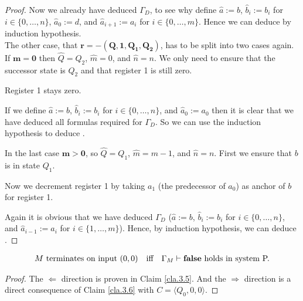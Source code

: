 \begin{proof}
	Now we already have deduced $\Gamma_D$, to see why define $\widehat{a}:=b$, $\widehat{b}_i:=b_i$ for $i\in\{0,\dots,n\}$, $\widehat{a}_0:=d$, and $\widehat{a}_{i+1}:=a_i$ for $i\in\{0,\dots,m\}$.
	Hence we can deduce \false{} by induction hypothesis.\\
	
	The other case, that $\boldsymbol{r=-(Q,1,Q_1,Q_2)}$, has to be split into two cases again. If $\boldsymbol{m=0}$ then $\widehat{Q}=Q_2$, $\widehat{m}=0$, and $\widehat{n}=n$. We only need to ensure that the successor state is $Q_2$ and that register 1 is still zero.
	
	\begin{figure}[H]
		\centering
		
	\end{figure}
	
	Register 1 stays zero.
	
	\begin{figure}[H]
		\centering
		
	\end{figure}
	
	If we define $\widehat{a}:=b$, $\widehat{b}_i:=b_i$ for $i\in\{0,\dots,n\}$, and $\widehat{a}_0:=a_0$ then it is clear that we have deduced all formulas required for $\Gamma_D$. So we can use the induction hypothesis to deduce \false{}.
	
	In the last case $\boldsymbol{m>0}$, so $\widehat{Q}=Q_1$, $\widehat{m}=m-1$, and $\widehat{n}=n$. First we ensure that $b$ is in state $Q_1$.
	
	\begin{figure}[H]
		\centering
		
	\end{figure}
	
	Now we decrement register 1 by taking $a_1$ (the predecessor of $a_0$) as anchor of $b$ for register 1.
	
	\begin{figure}[H]
		\centering
		
	\end{figure}
	
	Again it is obvious that we have deduced $\Gamma_D$ ($\widehat{a}:=b$, $\widehat{b}_i:=b_i$ for $i\in\{0,\dots,n\}$, and $\widehat{a}_{i-1}:=a_i$ for $i\in\{1,\dots,m\}$). Hence, by induction hypothesis, we can deduce \false{}.
\end{proof}

\begin{lemma}\label{lem.3.7}
	\begin{align*} %
		  & \text{$M$ terminates on input $(0,0)$} &   & \text{iff} & \text{$\Gamma_M\PModels\false$ holds in system P.} 
	\end{align*}
\end{lemma}
\begin{proof}
	The $\Leftarrow$ direction is proven in Claim \ref{cla.3.5}. And the $\Rightarrow$ direction is a direct consequence of Claim \ref{cla.3.6} with $C=\langle Q_0,0,0\rangle$.
\end{proof}

